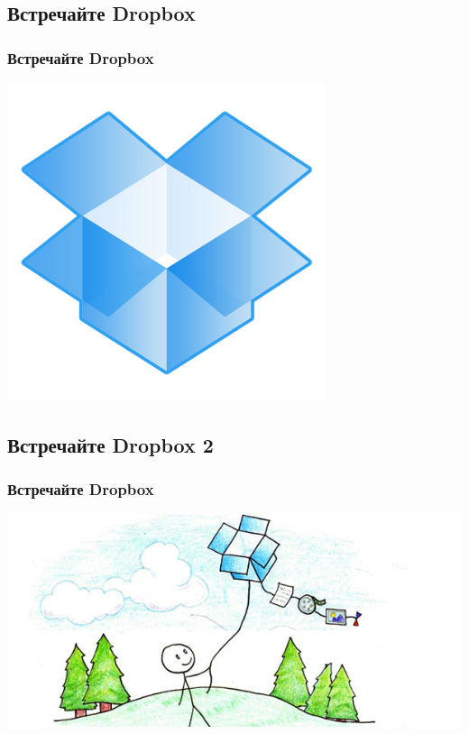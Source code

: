 \documentclass[compress,red]{beamer}
\begin{document}
\subsection{Встречайте Dropbox}
\begin{frame}[fragile]
  \frametitle{Встречайте Dropbox}
  \centerline{\includegraphics[width=0.7\textwidth]{images/dropbox-icon.png}}
\end{frame}

\subsection{Встречайте Dropbox 2}
\begin{frame}[fragile]
  \frametitle{Встречайте Dropbox}
  \centerline{\includegraphics[width=1.0\textwidth]{images/ilovedropbox1.jpg}}
\end{frame}
\end{document}
